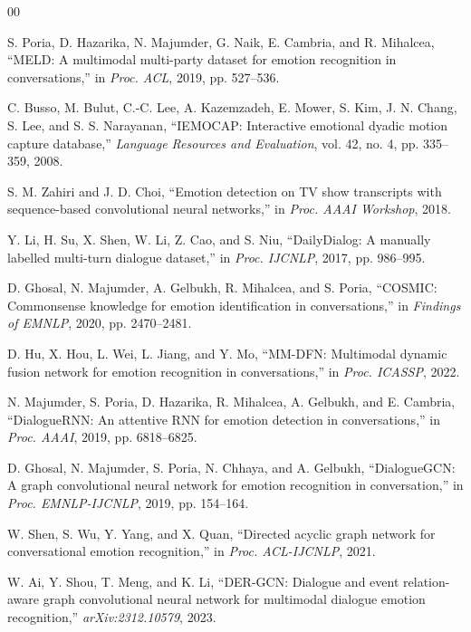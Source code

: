 \documentclass[conference]{IEEEtran}
\begin{document}
\begin{thebibliography}{00}

 S. Poria, D. Hazarika, N. Majumder, G. Naik, E. Cambria, and R. Mihalcea,
``MELD: A multimodal multi-party dataset for emotion recognition in conversations,'' in
\emph{Proc. ACL}, 2019, pp. 527--536.

 C. Busso, M. Bulut, C.-C. Lee, A. Kazemzadeh, E. Mower, S. Kim, J. N.
Chang, S. Lee, and S. S. Narayanan, ``IEMOCAP: Interactive emotional dyadic motion capture
database,'' \emph{Language Resources and Evaluation}, vol. 42, no. 4, pp. 335--359, 2008.

 S. M. Zahiri and J. D. Choi, ``Emotion detection on TV show
transcripts with sequence-based convolutional neural networks,'' in \emph{Proc. AAAI Workshop},
2018.

 Y. Li, H. Su, X. Shen, W. Li, Z. Cao, and S. Niu, ``DailyDialog: A
manually labelled multi-turn dialogue dataset,'' in \emph{Proc. IJCNLP}, 2017, pp. 986--995.

 D. Ghosal, N. Majumder, A. Gelbukh, R. Mihalcea, and S. Poria, ``COSMIC:
Commonsense knowledge for emotion identification in conversations,'' in \emph{Findings of EMNLP},
2020, pp. 2470--2481.

 D. Hu, X. Hou, L. Wei, L. Jiang, and Y. Mo, ``MM-DFN: Multimodal dynamic
fusion network for emotion recognition in conversations,'' in \emph{Proc. ICASSP}, 2022.

 N. Majumder, S. Poria, D. Hazarika, R. Mihalcea, A. Gelbukh, and
E. Cambria, ``DialogueRNN: An attentive RNN for emotion detection in conversations,'' in
\emph{Proc. AAAI}, 2019, pp. 6818--6825.

 D. Ghosal, N. Majumder, S. Poria, N. Chhaya, and A. Gelbukh,
``DialogueGCN: A graph convolutional neural network for emotion recognition in conversation,'' in
\emph{Proc. EMNLP-IJCNLP}, 2019, pp. 154--164.

 W. Shen, S. Wu, Y. Yang, and X. Quan, ``Directed acyclic graph network for
conversational emotion recognition,'' in \emph{Proc. ACL-IJCNLP}, 2021.

 W. Ai, Y. Shou, T. Meng, and K. Li, ``DER-GCN: Dialogue and event
relation-aware graph convolutional neural network for multimodal dialogue emotion recognition,''
\emph{arXiv:2312.10579}, 2023.


\end{thebibliography}
\end{document}

